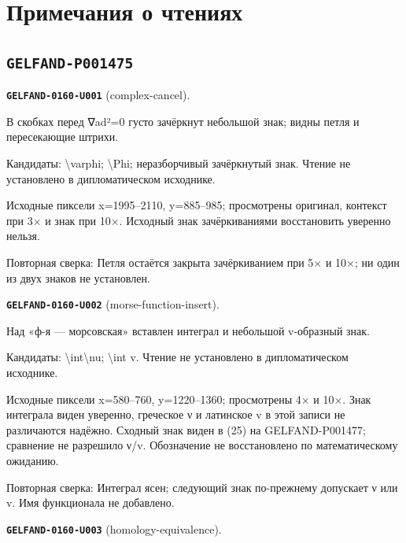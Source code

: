 \section*{Примечания о чтениях}
\subsection*{\texttt{GELFAND-P001475}}
\par\noindent\leavevmode{}\label{GELFAND-0160-U001}\label{GELFAND-P001475:complex-cancel}\textbf{\texttt{GELFAND-0160-U001}} (complex-cancel).\nopagebreak[4]\par
В скобках перед ∇ad²=0 густо зачёркнут небольшой знак; видны петля и пересекающие штрихи.\par
Кандидаты: \textbackslash{}varphi; \textbackslash{}Phi; неразборчивый зачёркнутый знак. Чтение не установлено в дипломатическом исходнике.\par
Исходные пиксели x=1995–2110, y=885–985; просмотрены оригинал, контекст при 3× и знак при 10×. Исходный знак зачёркиваниями восстановить уверенно нельзя.\par
Повторная сверка: Петля остаётся закрыта зачёркиванием при 5× и 10×; ни один из двух знаков не установлен.\par\medskip
\par\noindent\leavevmode{}\label{GELFAND-0160-U002}\label{GELFAND-P001475:morse-function-insert}\textbf{\texttt{GELFAND-0160-U002}} (morse-function-insert).\nopagebreak[4]\par
Над «ф-я — морсовская» вставлен интеграл и небольшой v-образный знак.\par
Кандидаты: \textbackslash{}int\textbackslash{}nu; \textbackslash{}int v. Чтение не установлено в дипломатическом исходнике.\par
Исходные пиксели x=580–760, y=1220–1360; просмотрены 4× и 10×. Знак интеграла виден уверенно, греческое ν и латинское v в этой записи не различаются надёжно. Сходный знак виден в (25) на GELFAND-P001477; сравнение не разрешило ν/v. Обозначение не восстановлено по математическому ожиданию.\par
Повторная сверка: Интеграл ясен; следующий знак по-прежнему допускает ν или v. Имя функционала не добавлено.\par\medskip
\par\noindent\leavevmode{}\label{GELFAND-0160-U003}\label{GELFAND-P001475:homology-equivalence}\textbf{\texttt{GELFAND-0160-U003}} (homology-equivalence).\nopagebreak[4]\par
